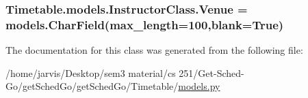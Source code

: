 \subsubsection[{\texorpdfstring{Venue}{Venue}}]{\setlength{\rightskip}{0pt plus 5cm}Timetable.\+models.\+Instructor\+Class.\+Venue = models.\+Char\+Field(max\+\_\+length=100,blank=True)\hspace{0.3cm}{\ttfamily [static]}}\hypertarget{classTimetable_1_1models_1_1InstructorClass_a87d254b4d0a0b634824d3ac69920ec2d}{}\label{classTimetable_1_1models_1_1InstructorClass_a87d254b4d0a0b634824d3ac69920ec2d}


The documentation for this class was generated from the following file\+:\begin{DoxyCompactItemize}
\item 
/home/jarvis/\+Desktop/sem3 material/cs 251/\+Get-\/\+Sched-\/\+Go/get\+Sched\+Go/get\+Sched\+Go/\+Timetable/\hyperlink{Timetable_2models_8py}{models.\+py}\end{DoxyCompactItemize}

